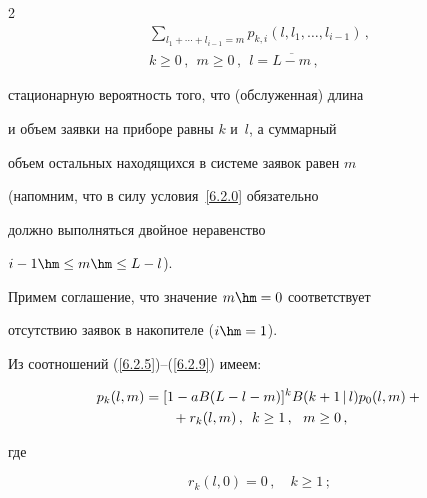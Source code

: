 \begin{multicols}{2}
\begin{multline*}
\sum\limits_{l_1+\cdots+l_{i-1}=m}


p_{k,i}(l,l_1,\ldots,l_{i-1})\,,


\\


 k\ge 0\,,\ \ m\ge 0\,,\ \ l=\overline{L-m}\,,


\end{multline*}


стационарную вероятность того, что (обслуженная) длина


и объем заявки на приборе равны $k$ и~$l$, а суммарный


объем остальных находящихся в сис\-те\-ме заявок равен $m$


(напомним, что в силу условия~\eqref{6.2.0} обязательно


должно выполняться двойное неравенство


$i-1\hm\le m \hm\le L-l$).


Примем соглашение, что значение $m\hm=0$ соответствует


отсутствию заявок в накопителе ($i\hm=1$).





Из соотношений (\ref{6.2.5})--(\ref{6.2.9}) имеем:




\begin{multline}


\label{6.2*.11}


p_{k}(l,m)


=[1 - a B(L-l-m)]^k


B(k+1\,\vert\,l) p_{0}(l,m)


+{}\\


{}+ r_{k}(l,m)\,,


\enskip


k \ge 1\,,\ \ m\ge 0\,,


\end{multline}


где


\begin{equation}


\label{6.2*.12}


r_{k}(l,0) = 0\,, \quad k \ge 1\,;


\end{equation}








\end{multicols}
